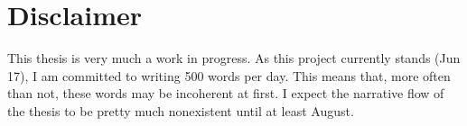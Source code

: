 \section*{Disclaimer}
This thesis is very much a work in progress. As this project currently stands (Jun 17), I am committed to writing 500 words per day. This means that, more often than not, these words may be incoherent at first. I expect the narrative flow of the thesis to be pretty much nonexistent until at least August.

